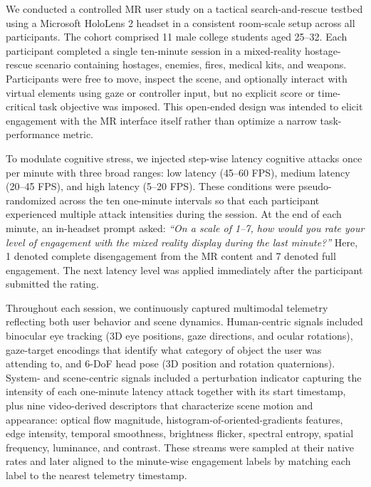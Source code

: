 \documentclass[review]{vgtc}                 %
\begin{document}

We conducted a controlled MR user study on a tactical search-and-rescue testbed using a Microsoft HoloLens 2 headset in a consistent room-scale setup across all participants. The cohort comprised 11 male college students aged 25--32. Each participant completed a single ten-minute session in a mixed-reality hostage-rescue scenario containing hostages, enemies, fires, medical kits, and weapons. Participants were free to move, inspect the scene, and optionally interact with virtual elements using gaze or controller input, but no explicit score or time-critical task objective was imposed. This open-ended design was intended to elicit engagement with the MR interface itself rather than optimize a narrow task-performance metric.

To modulate cognitive stress, we injected step-wise latency cognitive attacks once per minute with three broad ranges: low latency (45--60 FPS), medium latency (20--45 FPS), and high latency (5--20 FPS). These conditions were pseudo-randomized across the ten one-minute intervals so that each participant experienced multiple attack intensities during the session. At the end of each minute, an in-headset prompt asked: \emph{``On a scale of 1--7, how would you rate your level of engagement with the mixed reality display during the last minute?''} Here, 1 denoted complete disengagement from the MR content and 7 denoted full engagement. The next latency level was applied immediately after the participant submitted the rating.

Throughout each session, we continuously captured multimodal telemetry reflecting both user behavior and scene dynamics. Human-centric signals included binocular eye tracking (3D eye positions, gaze directions, and ocular rotations), gaze-target encodings that identify what category of object the user was attending to, and 6-DoF head pose (3D position and rotation quaternions). System- and scene-centric signals included a perturbation indicator capturing the intensity of each one-minute latency attack together with its start timestamp, plus nine video-derived descriptors that characterize scene motion and appearance: optical flow magnitude, histogram-of-oriented-gradients features, edge intensity, temporal smoothness, brightness flicker, spectral entropy, spatial frequency, luminance, and contrast. These streams were sampled at their native rates and later aligned to the minute-wise engagement labels by matching each label to the nearest telemetry timestamp.
\end{document}
